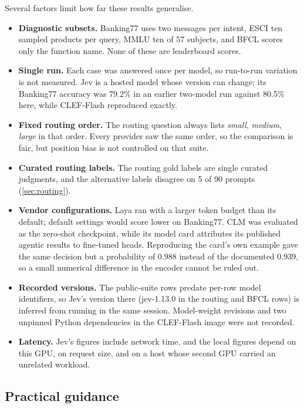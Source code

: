 \documentclass[11pt,a4paper]{article}
\begin{document}
Several factors limit how far these results generalise.

\begin{itemize}
  \item \textbf{Diagnostic subsets.} Banking77 uses two messages per intent, ESCI ten sampled products
        per query, MMLU ten of 57 subjects, and BFCL scores only the function name. None of these are
        leaderboard scores.
  \item \textbf{Single run.} Each case was answered once per model, so run-to-run variation is not
        measured. Jev is a hosted model whose version can change; its Banking77 accuracy was 79.2\% in
        an earlier two-model run against 80.5\% here, while CLEF-Flash reproduced exactly.
  \item \textbf{Fixed routing order.} The routing question always lists \emph{small}, \emph{medium},
        \emph{large} in that order. Every provider saw the same order, so the comparison is fair, but
        position bias \cite{zheng2024selectors,pezeshkpour2024order} is not controlled on that suite.
  \item \textbf{Curated routing labels.} The routing gold labels are single curated judgments, and the
        alternative labels disagree on 5 of 90 prompts (\cref{sec:routing}).
  \item \textbf{Vendor configurations.} Laya ran with a larger token budget than its default; default
        settings would score lower on Banking77. CLM was evaluated as the zero-shot checkpoint, while its
        model card attributes its published agentic results to fine-tuned heads. Reproducing the card's
        own example gave the same decision but a probability of 0.988 instead of the documented 0.939, so
        a small numerical difference in the encoder cannot be ruled out.
  \item \textbf{Recorded versions.} The public-suite rows predate per-row model identifiers, so Jev's
        version there (jev-1.13.0 in the routing and BFCL rows) is inferred from running in the same
        session. Model-weight revisions and two unpinned Python dependencies in the CLEF-Flash image
        were not recorded.
  \item \textbf{Latency.} Jev's figures include network time, and the local figures depend on this GPU,
        on request size, and on a host whose second GPU carried an unrelated workload.
\end{itemize}

\subsection{Practical guidance}\label{sec:guidance}
\end{document}
